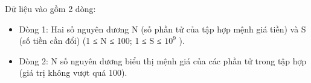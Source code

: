 Dữ liệu vào gồm 2 dòng:  
\begin{itemize}
	\item     Dòng 1: Hai số nguyên dương N (số phần tử của tập hợp mệnh giá tiền) và S (số tiền cần đổi) (1 ≤ N ≤ 100; 1 ≤ S ≤ $10^{9}$    ).   
	\item     Dòng 2: N số nguyên dương biểu thị mệnh giá của các phần tử trong tập hợp (giá trị không vượt quá 100).   
\end{itemize}